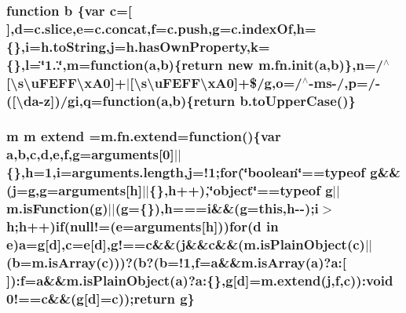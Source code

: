 \subsubsection[{b}]{\setlength{\rightskip}{0pt plus 5cm}function b \{var {\bf c}=\mbox{[}$\,$\mbox{]},{\bf d}=c.\+slice,{\bf e}=c.\+concat,f=c.\+push,g=c.\+index\+Of,h=\{\},i=h.\+to\+String,j=h.\+has\+Own\+Property,k=\{\},l=\char`\"{}1..\char`\"{},m=function({\bf a},b)\{return new m.\+fn.\+init({\bf a},b)\},{\bf n}=/$^\wedge$\mbox{[}\textbackslash{}s\textbackslash{}u\+F\+E\+F\+F\textbackslash{}x\+A0\mbox{]}+$\vert$\mbox{[}\textbackslash{}s\textbackslash{}u\+F\+E\+F\+F\textbackslash{}x\+A0\mbox{]}+\$/g,o=/$^\wedge$-\/ms-\//,p=/-\/(\mbox{[}\textbackslash{}da-\/z\mbox{]})/gi,q=function({\bf a},b)\{return b.\+to\+Upper\+Case()\}}\label{_admin_2assets_2js_2jquery-1_811_82_8min_8js_ac0431efac4d7c393d1e70b86115cb93f}
\hypertarget{_admin_2assets_2js_2jquery-1_811_82_8min_8js_a167947be5252c14d5389d8a01a8c8545}{}
\subsubsection[{extend}]{\setlength{\rightskip}{0pt plus 5cm}m m extend =m.\+fn.\+extend=function()\{var {\bf a},{\bf b},{\bf c},{\bf d},{\bf e},f,g=arguments\mbox{[}0\mbox{]}$\vert$$\vert$\{\},h=1,i=arguments.\+length,j=!1;{\bf for}(\char`\"{}boolean\char`\"{}==typeof g\&\&(j=g,g=arguments\mbox{[}h\mbox{]}$\vert$$\vert$\{\},h++),\char`\"{}object\char`\"{}==typeof g$\vert$$\vert$m.\+is\+Function(g)$\vert$$\vert$(g=\{\}),h===i\&\&(g=this,h-\/-\/);i$>$h;h++){\bf if}(null!=({\bf e}=arguments\mbox{[}h\mbox{]})){\bf for}({\bf d} in {\bf e}){\bf a}=g\mbox{[}{\bf d}\mbox{]},{\bf c}={\bf e}\mbox{[}{\bf d}\mbox{]},g!=={\bf c}\&\&(j\&\&{\bf c}\&\&(m.\+is\+Plain\+Object({\bf c})$\vert$$\vert$({\bf b}=m.\+is\+Array({\bf c})))?({\bf b}?({\bf b}=!1,f={\bf a}\&\&m.\+is\+Array({\bf a})?a\+:\mbox{[}$\,$\mbox{]})\+:f={\bf a}\&\&m.\+is\+Plain\+Object({\bf a})?a\+:\{\},g\mbox{[}{\bf d}\mbox{]}=m.\+extend(j,f,{\bf c}))\+:void 0!=={\bf c}\&\&(g\mbox{[}{\bf d}\mbox{]}={\bf c}));return g\}}\label{_admin_2assets_2js_2jquery-1_811_82_8min_8js_a167947be5252c14d5389d8a01a8c8545}
\hypertarget{_admin_2assets_2js_2jquery-1_811_82_8min_8js_ab2836ee14921cbd6e34ea91a9a99ad66}{}
